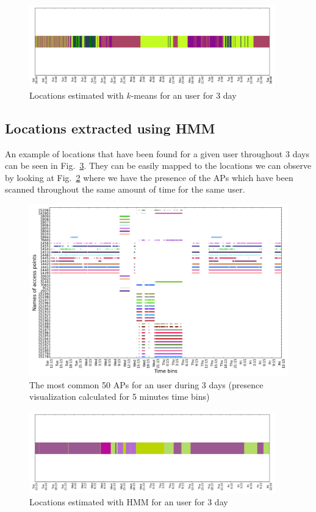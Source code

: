\begin{figure}[!h]
\centering
\includegraphics[width=0.95\textwidth]{figures/kmeans/user_93_kmeans_locations_(5)_3days_plot.png}
\caption{Locations estimated with $k$-means for an user for 3 day}
\label{user_93_days1_to_3_kmeans_A}
\end{figure}

\subsection{Locations extracted using HMM}
\label{appendix_hmm}

An example of locations that have been found for a given user throughout $3$
days can be seen in Fig.~\ref{user_6_days1_to_3_hmm}. They can be easily mapped
to the locations we can observe by looking at
Fig.~\ref{user_6_days1_to_3_APs_presence} where we have the presence of the APs
which have been scanned throughout the same amount of time for the same user.

\begin{figure}[!h] \centering
\includegraphics[width=\textwidth]{figures/hmm/user_6_sorted_3days_no_rssi_plot.png}
\caption{The most common 50 APs for an user during 3 days (presence
visualization calculated for 5 minutes time bins)}
\label{user_6_days1_to_3_APs_presence}
\end{figure}

\begin{figure}[!h]
\centering
\includegraphics[width=0.95\textwidth]{figures/hmm/hmm_locations_(5)_3days_plot.png}
\caption{Locations estimated with HMM for an user for 3 day}
\label{user_6_days1_to_3_hmm}
\end{figure}